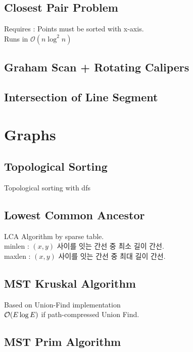 \documentclass[landscape,8pt]{article}
\begin{document}
\begin{multicols}{2}
  \subsection{Closest Pair Problem}
    Requires : Points must be sorted with x-axis.\\
    Runs in $\mathcal{O}(n \log^2 n)$
    
  \subsection{Graham Scan + Rotating Calipers}
    

  \subsection{Intersection of Line Segment}
    

\section{Graphs}
  \subsection{Topological Sorting}
  Topological sorting with dfs
    

  \subsection{Lowest Common Ancestor}
  LCA Algorithm by sparse table.\\
  minlen : $(x, y)$ 사이를 잇는 간선 중 최소 길이 간선.\\
  maxlen : $(x, y)$ 사이를 잇는 간선 중 최대 길이 간선.
    

  \subsection{MST Kruskal Algorithm}
  Based on Union-Find implementation\\
  $\order{E \log E}$ if path-compressed Union Find.
    

  \subsection{MST Prim Algorithm}
    


\end{multicols}
\end{document}
